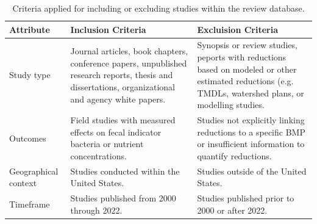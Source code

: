 \documentclass[utf8]{FrontiersinHarvard}
\begin{document}
\begin{table}

\caption{\label{tab:criteria}Criteria applied for including or excluding studies within the review database.}
\centering
\begin{tabular}[t]{>{\raggedright\arraybackslash}p{5em}>{\raggedright\arraybackslash}p{15em}>{\raggedright\arraybackslash}p{15em}}
\toprule
Attribute & Inclusion Criteria & Excluision Criteria\\
\midrule
Study type & Journal articles, book chapters, conference papers, unpublished research reports, thesis and dissertations, organizational and agency white papers. & Synopsis or review studies, peports with reductions based on modeled or other estimated reductions (e.g. TMDLs, watershed plans, or modelling studies.\\
Outcomes & Field studies with measured effects on fecal indicator bacteria or nutrient concentrations. & Studies not explicitly linking reductions to a specific BMP or insufficient information to quantify reductions.\\
Geographical context & Studies conducted within the United States. & Studies outside of the United States.\\
Timeframe & Studies published from 2000 through 2022. & Studies published prior to 2000 or after 2022.\\
\bottomrule
\end{tabular}
\end{table}
\end{document}

